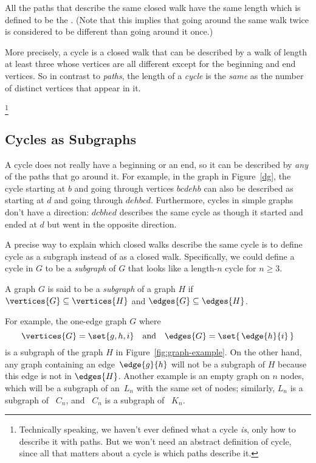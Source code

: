 All the paths that describe the same closed walk have the same length
which is defined to be the .  (Note that this
implies that going around the same walk twice is considered to be
different than going around it once.)

More precisely, a cycle is a
closed walk that can be described by a walk of length at least three whose
vertices are all different except for the beginning and end vertices.
So in contrast to \emph{paths}, the length of a \emph{cycle} is the
\emph{same} as the number of distinct vertices that appear in it.

\footnote{Technically speaking, we haven't ever defined what a cycle
\emph{is}, only how to describe it with paths.  But we won't need an
abstract definition of cycle, since all that matters about a cycle is which
paths describe it.}
\fi

\subsection{Cycles as Subgraphs}

A cycle does not really have a beginning or an end, so it can be
described by \emph{any} of the paths that go around it.  For example,
in the graph in Figure~\ref{dg}, the cycle starting at $b$ and going
through vertices $bcdehb$ can also be described as starting at $d$ and
going through $dehbcd$.  Furthermore, cycles in simple graphs don't
have a direction: $dcbhed$ describes the same cycle as though it
started and ended at $d$ but went in the opposite direction.

A precise way to explain which closed walks describe the same cycle is
to define cycle as a subgraph instead of as a closed walk.  Specifically, we
could define a cycle in $G$ to be a \emph{subgraph} of $G$ that looks
like a length-$n$ cycle for $n \ge 3$.

\begin{definition}\label{def:subgraph}
  A graph $G$ is said to be a \emph{subgraph} of a graph $H$ if
  $\vertices{G} \subseteq \vertices{H}$ and $\edges{G} \subseteq
  \edges{H}$.
\end{definition}

For example, the one-edge graph $G$ where
\begin{equation*}
   \vertices{G} = \set{ g, h, i } \quad \text{and}\quad  \edges{G} =
   \set{\, \edge{h}{i} \, }
\end{equation*}
is a subgraph of the graph $H$ in Figure~\ref{fig:graph-example}.  On the
other hand, any graph containing an edge~$\edge{g}{h}$ will not be a
subgraph of $H$ because this edge is not in $\edges{H}$.  Another example
is an empty graph on $n$ nodes, which will be a subgraph of an~$L_n$ with
the same set of nodes; similarly, $L_n$ is a subgraph of ~$C_n$, and ~$C_n$ is
a subgraph of ~$K_n$.

